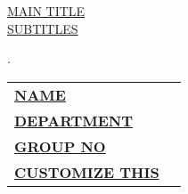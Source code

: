 \documentclass[12pt,a4paper]{article}
\begin{document}
\begin{titlepage}
	
	\begin{flushright}
        \textbf{\uppercase{\fontsize{12}{18} \selectfont {Assignment No: 01}}}
    \end{flushright}

    \vspace*{\fill}
    \begin{center}
        \uppercase{\fontsize{30}{45}\selectfont \ul{MAIN TITLE}}\\
        \uppercase{\fontsize{20}{30}\selectfont \ul{Subtitles}}
    \end{center}
    \vfill %
    \begin{multicols}{2}
        .\\

        \columnbreak	
        \begin{tabular}{ll}
            \vspace{6pt}

            \textbf{\uppercase{\underline{Name}}}       &
            \textbf{\uppercase{\fontsize{12}{18} \selectfont {:}}} 
            {\fontsize{12}{18} \selectfont {<Your Name Here>}}      \\

            \vspace{6pt}
            \textbf{\uppercase{\underline{Department}}} &
            \textbf{\uppercase{\fontsize{12}{18} \selectfont {:}}} 
            {\fontsize{12}{18} \selectfont {<Your Department Here>}}\\

            \vspace{6pt}
            \textbf{\uppercase{\underline{Group No}}}   &
            \textbf{\uppercase{\fontsize{12}{18} \selectfont {:}}} 
            {\fontsize{12}{18} \selectfont {Anything}}  \\

            \vspace{6pt}
            \textbf{\uppercase{\underline{Customize This}}}   &
            \textbf{\uppercase{\fontsize{12}{18} \selectfont {:}}} 
            {\fontsize{12}{18} \selectfont {Change Here}}  \\


        \end{tabular}
    \end{multicols}

\end{titlepage}
\end{document}
